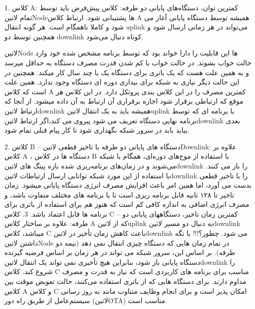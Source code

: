          
1. کلاس A: کمترین توان، دستگاه‌های پایانی دو طرفه:
کلاس پیش‌فرض باید توسط تمام ‌لاتین{Node}ها پشتیبانی شود. ارتباط کلاس A همیشه توسط دستگاه پایانی آغاز می شود و کاملا ناهمگام است. هر گونه انتقال uplink می‌تواند در هر زمانی ارسال شود و همچنین توسط دو downlink کوتاه دنبال می‌شود.

‌لاتین{Node} ها این قابلیت را دارا خواند بود که توسط برنامه مشخص شده خود وارد حالت خواب بشوند. در حالت خواب با کم شدن قدرت مصرف دستگاه به حداقل میرسد و به همین علت هست که یک باتری برای دستگاه یک یا چند سال کار میکند. همچنین در این حالت دیگر نیازی به شبکه برای بیداری دوره ای دستگاه وجود ندارد. همین علت است که کلاس A کمترین مصرف را در این کلاس بندی پروتکل دارد. در این کلاس هر موقع که ارتباطی برقرار شود اجازه برقراری آن ارتباط به آن داده میشود. از آنجا که ارتباط ‌لاتین{downlink} همیشه باید به یک انتقال ‌لاتین{uplink} با برنامه ای که توسط برنامه نهایی دستگاه تعریف می شود پیروی می کند،اگر ارتباط ‌لاتین{downlink} بعدی بیاید باید در سرور شبکه نگهداری شود تا کار پیام قبلی تمام شود.

2. کلاس B – دستگاه های پایانی دو طرفه با تاخیر قطعی ‌لاتین{Downlink}:
علاوه بر کلاس A ، دستگاه ها در کلاس B با استفاده از موج‌های دوره‌ای، همگام با شبکه می‌شوند و در زمان‌های برنامه‌ریزی شده بازه پینگ های ‌‌لاتین{downlink} را باز می کنند. با استفاده از این مورد شبکه توانایی ارسال ارتباطات ‌‌لاتین{downlink} را با تاخیر قطعی بدست می آورد، اما همین امر باعث افزایش مصرف انرژی دستگاه پایانی میشود. زمان تاخیر تا ۱۲۸ ثانیه قابل برنامه ریزی است تا با برنامه های مختلف متفاوت باشد، و مصرف انرژی اضافی به اندازه کافی کم است که هنوز هم برای استفاده از باتری برای برنامه ها قابل اعتماد باشد.
3. کلاس C – کمترین زمان تاخیر، دستگاههای پایانی دو طرفه:
علاوه بر ساختار کلاس A که از ‌‌لاتین{uplink} به دنبال دو مسیر ‌‌لاتین{downlink} میباشد، کلاس C باعث کاهش زمان تأخیر در ‌‌لاتین{downlink} می شود. چطور؟!!! با نگه داشتن ‌لاتین{Node} در تمام زمان هایی که دستگاه چیزی انتقال نمی دهد (نیمه دو طرفه). بر اساس این، سرور شبکه می تواند در هر زمان بر اساس فرضیه گیرنده دستگاه پایانی باز شود، بنابراین هیچ تأخیری نمی تواند یک انتقال ‌‌لاتین{downlink} را شروع کند. کلاس C مناسب برای برنامه های کاربردی است که نیاز به قدرت و مصرف مداوم دارند. برای دستگاه هایی که از باتری استفاده می‌کنند، حالت تعویض موقت بین کلاس A و کلاس C امکان پذیر است و برای انجام وظایف متناوب مانند به روز رسانی سیستم‌عامل از طریق راه دور (‌لاتین{OTA}) مناسب است.

